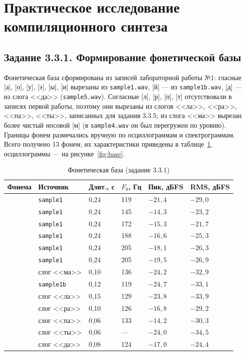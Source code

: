 \section{Практическое исследование компиляционного синтеза}

\subsection{Задание 3.3.1. Формирование фонетической базы}

Фонетическая база сформирована из записей лабораторной работы №1: гласные
[а], [о], [у], [э], [ы], [и] вырезаны из \texttt{sample1.wav}, [й] --- из
\texttt{sample1b.wav}, [д] --- из слога <<да>> (\texttt{sample5.wav}).
Согласные [л], [р], [п], [т] отсутствовали в записях первой работы, поэтому
они вырезаны из слогов <<ла>>, <<ра>>, <<па>>, <<ты>>, записанных для
задания 3.3.5; из слога <<ма>> вырезан более чистый носовой [м] (в
\texttt{sample4.wav} он был перегружен по уровню). Границы фонем
размечались вручную по осциллограммам и спектрограммам. Всего получено
13 фонем; их характеристики приведены в таблице~\ref{tab:base},
осциллограммы --- на рисунке~\ref{fig:base}.

\begin{table}[H]
	\centering
	\small
	\caption{Фонетическая база (задание 3.3.1)}
	\label{tab:base}
	\begin{tabular}{|l|l|l|l|l|l|}
		\hline
		Фонема & Источник & Длит., с & $F_0$, Гц & Пик, дБFS & RMS, дБFS \\
		\hline
		[а] & \texttt{sample1} & 0,24 & 119 & $-21{,}4$ & $-29{,}0$ \\
		\hline
		[о] & \texttt{sample1} & 0,24 & 145 & $-14{,}3$ & $-23{,}2$ \\
		\hline
		[у] & \texttt{sample1} & 0,24 & 172 & $-15{,}3$ & $-21{,}7$ \\
		\hline
		[э] & \texttt{sample1} & 0,24 & 188 & $-16{,}6$ & $-25{,}3$ \\
		\hline
		[ы] & \texttt{sample1} & 0,24 & 205 & $-18{,}1$ & $-26{,}3$ \\
		\hline
		[и] & \texttt{sample1} & 0,24 & 205 & $-19{,}5$ & $-26{,}9$ \\
		\hline
		[м] & слог <<ма>> & 0,10 & 136 & $-24{,}2$ & $-32{,}9$ \\
		\hline
		[й] & \texttt{sample1b} & 0,12 & 119 & $-24{,}7$ & $-33{,}1$ \\
		\hline
		[л] & слог <<ла>> & 0,15 & 129 & $-23{,}8$ & $-33{,}9$ \\
		\hline
		[р] & слог <<ра>> & 0,10 & 126 & $-16{,}8$ & $-29{,}2$ \\
		\hline
		[п] & слог <<па>> & 0,06 & 133 & $-14{,}2$ & $-30{,}3$ \\
		\hline
		[т] & слог <<ты>> & 0,06 & --- & $-24{,}0$ & $-34{,}5$ \\
		\hline
		[д] & слог <<да>> & 0,08 & 124 & $-17{,}0$ & $-24{,}4$ \\
		\hline
	\end{tabular}
\end{table}


